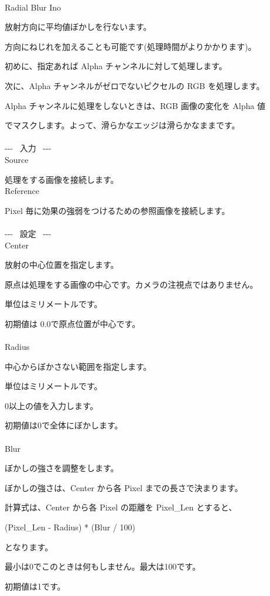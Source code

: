 \documentclass[a4paper,12pt]{article}
\begin{document}
\thispagestyle{empty}

\Large
\noindent \\
Radial Blur Ino\medskip
\par
\normalsize
放射方向に平均値ぼかしを行ないます。\par
方向にねじれを加えることも可能です(処理時間がよりかかります)。\\
\par
初めに、指定あれば Alpha チャンネルに対して処理します。\par
次に、Alpha チャンネルがゼロでないピクセルの RGB を処理します。\par
Alpha チャンネルに処理をしないときは、RGB 画像の変化を Alpha 値\par
でマスクします。よって、滑らかなエッジは滑らかなままです。\\
\\
-{-}- \ 入力 \ -{-}-\\
Source\par
処理をする画像を接続します。\\
Reference\par
Pixel 毎に効果の強弱をつけるための参照画像を接続します。\\
\\
-{-}- \ 設定 \ -{-}-\\
Center\par
放射の中心位置を指定します。\par
原点は処理をする画像の中心です。カメラの注視点ではありません。\par
単位はミリメートルです。\par
初期値は 0.0\textquotedbl で原点位置が中心です。\\
\\
Radius\par
中心からぼかさない範囲を指定します。\par
単位はミリメートルです。\par
0以上の値を入力します。\par
初期値は0で全体にぼかします。\\
\\
Blur\par
ぼかしの強さを調整をします。\par
ぼかしの強さは、Center から各 Pixel までの長さで決まります。\par
計算式は、Center から各 Pixel の距離を Pixel\_Len とすると、\par
(Pixel\_Len - Radius) * (Blur / 100)\par
となります。\par
最小は0でこのときは何もしません。最大は100です。\par
初期値は1です。
\end{document}
